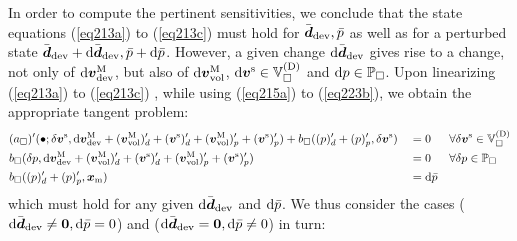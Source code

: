 \documentclass[10pt,a4paper]{article}
\begin{document}
In order to compute the pertinent sensitivities, we conclude that the state equations (\ref{eq213a}) to (\ref{eq213c}) must hold
for $\bar{\boldsymbol{d}}_{\mathrm{dev}},\bar{p}$ as well as for a perturbed state $\bar{\boldsymbol{d}}_{\mathrm{dev}}+\operatorname{d \!}\bar{\boldsymbol{d}}_{\mathrm{dev}}, \bar{p}+\operatorname{d \!}\bar{p}$. However, a given change $\operatorname{d \!}\bar{\boldsymbol{d}}_{\mathrm{dev}}$ gives rise to a change, not only of $\operatorname{d \!}\boldsymbol{v}^{\mathrm{M}}_{\mathrm{dev}}$, but also of $\operatorname{d \!}\boldsymbol{v}^{\mathrm{M}}_{\mathrm{vol}}$, $\operatorname{d \!}\boldsymbol{v}^{\mathrm{s}}\in\mathbb{V}_\Box^{(\mathrm{D})}$ and $\operatorname{d \!} p\in\mathbb{P}_\Box$. Upon linearizing (\ref{eq213a}) to (\ref{eq213c}) , while using (\ref{eq215a}) to (\ref{eq223b}), we obtain the appropriate tangent problem:
\begin{align}
    \label{eq253a} &
    (a_\Box)'(\bullet;\delta\boldsymbol{v}^{\mathrm{s}},\operatorname{d \!}\boldsymbol{v}^{\mathrm{M}}_{\mathrm{dev}}+(\boldsymbol{v}^{\mathrm{M}}_{\mathrm{vol}})'_d+(\boldsymbol{v}^{\mathrm{s}})'_d +
    (\boldsymbol{v}^{\mathrm{M}}_{\mathrm{vol}})'_p+(\boldsymbol{v}^{\mathrm{s}})'_p) +
    b_\Box((p)'_d + (p)'_p,\delta\boldsymbol{v}^{\mathrm{s}})
    && =
    0
    && \forall \delta \boldsymbol{v}^{\mathrm{s}}\in\mathbb{V}_\Box^{(\mathrm{D})}
 \\
    \label{eq253b} &
    b_\Box(\delta p,\operatorname{d \!}\boldsymbol{v}^{\mathrm{M}}_{\mathrm{dev}}+(\boldsymbol{v}^{\mathrm{M}}_{\mathrm{vol}})'_d+(\boldsymbol{v}^{\mathrm{s}})'_d +
    (\boldsymbol{v}^{\mathrm{M}}_{\mathrm{vol}})'_p+(\boldsymbol{v}^{\mathrm{s}})'_p)
    && =
    0
    && \forall \delta p\in\mathbb{P}_\Box
\\
    \label{eq253c} &
    b_\Box((p)'_d + (p)'_p,\boldsymbol{x}_{\mathrm{m}})
    && =
    \operatorname{d \!}\bar{p}
\end{align}
which must hold for any given $\operatorname{d \!}\bar{\boldsymbol{d}}_{\mathrm{dev}}$ and $\operatorname{d \!}\bar{p}$. We thus consider the cases ($\operatorname{d \!}\bar{\boldsymbol{d}}_{\mathrm{dev}}\neq \boldsymbol{0}, \operatorname{d \!}\bar{p}=0$) and ($\operatorname{d \!}\bar{\boldsymbol{d}}_{\mathrm{dev}}=\boldsymbol{0}, \operatorname{d \!}\bar{p}\neq 0$) in turn:
\end{document}
